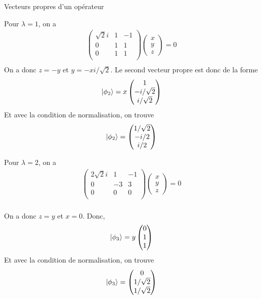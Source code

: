 \documentclass[12pt,solution=false]{uqtrassignment}
\begin{document}
\begin{problem}{Vecteurs propres d'un opérateur}
\begin{solution}
Pour $\lambda = 1$, on a
\begin{align}
  \begin{pmatrix}
     \sqrt{2} i   &  1 & - 1\\
     0            &   1          & 1\\
     0            &   1          & 1\\
  \end{pmatrix}
  \begin{pmatrix}
    x\\
    y\\
    z
  \end{pmatrix}
  = 0\\[3mm]
\end{align}
On a donc $z=-y$ et $y=-x i/\sqrt{2}$.
Le second vecteur propre est donc de la forme
\begin{align}
  \ket{\phi_2} = 
  x
  \begin{pmatrix}
    1\\
    -i/\sqrt{2}\\
    i/\sqrt{2}
  \end{pmatrix}
\end{align}
Et avec la condition de normalisation, on trouve
\begin{align}
  \ket{\phi_2} = 
  \begin{pmatrix}
    1/\sqrt{2}\\
    -i/2\\
     i/2
  \end{pmatrix}
\end{align}

Pour $\lambda = 2$, on a
\begin{align}
  \begin{pmatrix}
     2\sqrt{2} i   &  1 & - 1\\
     0            &  -3          & 3\\
     0            &   0          & 0\\
  \end{pmatrix}
  \begin{pmatrix}
    x\\
    y\\
    z
  \end{pmatrix}
  = 0\\[3mm]
\end{align}

On a donc $z=y$ et $x=0$.
Donc,
\begin{align}
  \ket{\phi_3} = 
  y
  \begin{pmatrix}
     0\\
     1\\
     1
  \end{pmatrix}
\end{align}
Et avec la condition de normalisation, on trouve
\begin{align}
  \ket{\phi_3} = 
  \begin{pmatrix}
     0\\
     1/\sqrt{2}\\
     1/\sqrt{2}
  \end{pmatrix}
\end{align}


\end{solution}
\end{problem}
\end{document}
